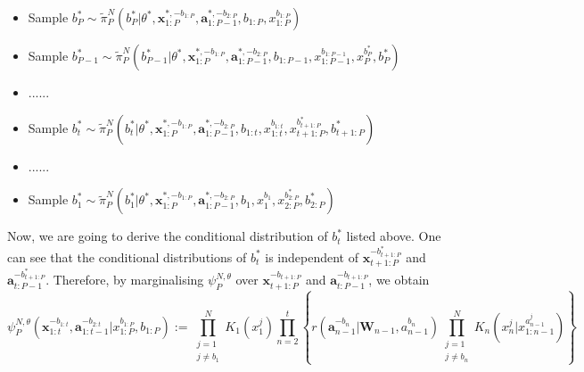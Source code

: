 \documentclass[12pt,a4paper]{article}
\begin{document}
\begin{itemize}
    \item Sample \(b_P^{*} \sim \tilde{\pi}_P^{N}(b_P^{*}|\theta^{*},\textbf{x}_{1:P}^{*,-b_{1:P}},\textbf{a}_{1:P-1}^{*,-b_{2:P}},b_{1:P},x_{1:P}^{b_{1:P}})\)
    \item Sample \(b_{P-1}^{*} \sim \tilde{\pi}_P^{N}(b_{P-1}^{*}|\theta^{*},\textbf{x}_{1:P}^{*,-b_{1:P}},\textbf{a}_{1:P-1}^{*,-b_{2:P}},b_{1:P-1},x_{1:P-1}^{b_{1:P-1}},x_P^{b_P^{*}},b_{P}^{*})\)
    \item ......
    \item Sample \(b_{t}^{*} \sim \tilde{\pi}_P^{N}(b_{t}^{*}|\theta^{*},\textbf{x}_{1:P}^{*,-b_{1:P}},\textbf{a}_{1:P-1}^{*,-b_{2:P}},b_{1:t},x_{1:t}^{b_{1:t}},x_{t+1:P}^{b_{t+1:P}^{*}},b_{t+1:P}^{*})\)
    \item ......
    \item Sample \(b_{1}^{*} \sim \tilde{\pi}_P^{N}(b_{1}^{*}|\theta^{*},\textbf{x}_{1:P}^{*,-b_{1:P}},\textbf{a}_{1:P-1}^{*,-b_{2:P}},b_{1},x_{1}^{b_{1}},x_{2:P}^{b_{2:P}^{*}},b_{2:P}^{*})\)
\end{itemize}
Now, we are going to derive the conditional distribution of \(b_t^{*}\) listed above. One can see that the conditional distributions of $b_t^{*}$ is independent of \(\mathbf{x}_{t+1:P}^{-b_{t+1:P}^{*}}\) and \(\mathbf{a}_{t:P-1}^{-b_{t+1:P}^{*}}\). Therefore, by marginalising \(\psi_{P}^{N,\theta}\) over \(\mathbf{x}_{t+1:P}^{-b_{t+1:P}}\) and \(\mathbf{a}_{t:P-1}^{-b_{t+1:P}}\), we obtain 
\begin{equation}
    \label{PMCMC-Marginal of psi}
    \psi_{P}^{N,\theta}(\mathbf{x}_{1:t}^{-b_{1:t}},\mathbf{a}_{1:t-1}^{-b_{2:t}}|x_{1:P}^{b_{1:P}},b_{1:P}) := \prod_{\substack{j=1\\j \neq b_1}}^{N} K_1\left(x_1^j\right)\prod_{n=2}^t \left\{r\left(\mathbf{a}_{n-1}^{-b_{n}}|\mathbf{W}_{n-1},a_{n-1}^{b_n}\right)\prod_{\substack{j=1\\ j \neq b_n}}^{N} K_n(x_n^j|x_{1:n-1}^{a_{n-1}^j})\right\}
\end{equation}
\end{document}

